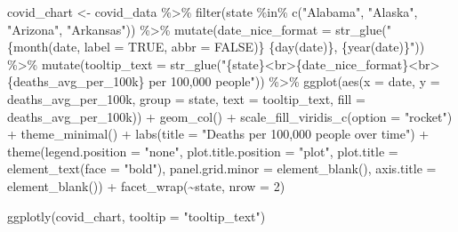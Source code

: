 \documentclass[
]{book}
\newenvironment{Shaded}{\begin{snugshade}}{\end{snugshade}}
\newcommand{\AttributeTok}[1]{\textcolor[rgb]{0.77,0.63,0.00}{#1}}
\newcommand{\DecValTok}[1]{\textcolor[rgb]{0.00,0.00,0.81}{#1}}
\newcommand{\FunctionTok}[1]{\textcolor[rgb]{0.00,0.00,0.00}{#1}}
\newcommand{\NormalTok}[1]{#1}
\newcommand{\OtherTok}[1]{\textcolor[rgb]{0.56,0.35,0.01}{#1}}
\newcommand{\SpecialCharTok}[1]{\textcolor[rgb]{0.00,0.00,0.00}{#1}}
\newcommand{\StringTok}[1]{\textcolor[rgb]{0.31,0.60,0.02}{#1}}
\begin{document}
\begin{Shaded}
\begin{Highlighting}[]
\NormalTok{covid\_chart }\OtherTok{\textless{}{-}}\NormalTok{ covid\_data }\SpecialCharTok{\%\textgreater{}\%} 
  \FunctionTok{filter}\NormalTok{(state }\SpecialCharTok{\%in\%} \FunctionTok{c}\NormalTok{(}\StringTok{"Alabama"}\NormalTok{,}
                      \StringTok{"Alaska"}\NormalTok{,}
                      \StringTok{"Arizona"}\NormalTok{,}
                      \StringTok{"Arkansas"}\NormalTok{)) }\SpecialCharTok{\%\textgreater{}\%} 
    \FunctionTok{mutate}\NormalTok{(}\AttributeTok{date\_nice\_format =} \FunctionTok{str\_glue}\NormalTok{(}\StringTok{"\{month(date, label = TRUE, abbr = FALSE)\} \{day(date)\}, \{year(date)\}"}\NormalTok{)) }\SpecialCharTok{\%\textgreater{}\%} 
  \FunctionTok{mutate}\NormalTok{(}\AttributeTok{tooltip\_text =} \FunctionTok{str\_glue}\NormalTok{(}\StringTok{"\{state\}\textless{}br\textgreater{}\{date\_nice\_format\}\textless{}br\textgreater{}\{deaths\_avg\_per\_100k\} per 100,000 people"}\NormalTok{)) }\SpecialCharTok{\%\textgreater{}\%} 
  \FunctionTok{ggplot}\NormalTok{(}\FunctionTok{aes}\NormalTok{(}\AttributeTok{x =}\NormalTok{ date,}
             \AttributeTok{y =}\NormalTok{ deaths\_avg\_per\_100k,}
             \AttributeTok{group =}\NormalTok{ state,}
             \AttributeTok{text =}\NormalTok{ tooltip\_text,}
             \AttributeTok{fill =}\NormalTok{ deaths\_avg\_per\_100k)) }\SpecialCharTok{+}
  \FunctionTok{geom\_col}\NormalTok{() }\SpecialCharTok{+}
  \FunctionTok{scale\_fill\_viridis\_c}\NormalTok{(}\AttributeTok{option =} \StringTok{"rocket"}\NormalTok{) }\SpecialCharTok{+}
  \FunctionTok{theme\_minimal}\NormalTok{() }\SpecialCharTok{+}
  \FunctionTok{labs}\NormalTok{(}\AttributeTok{title =} \StringTok{"Deaths per 100,000 people over time"}\NormalTok{) }\SpecialCharTok{+}
  \FunctionTok{theme}\NormalTok{(}\AttributeTok{legend.position =} \StringTok{"none"}\NormalTok{,}
        \AttributeTok{plot.title.position =} \StringTok{"plot"}\NormalTok{,}
        \AttributeTok{plot.title =} \FunctionTok{element\_text}\NormalTok{(}\AttributeTok{face =} \StringTok{"bold"}\NormalTok{),}
        \AttributeTok{panel.grid.minor =} \FunctionTok{element\_blank}\NormalTok{(),}
        \AttributeTok{axis.title =} \FunctionTok{element\_blank}\NormalTok{()) }\SpecialCharTok{+}
  \FunctionTok{facet\_wrap}\NormalTok{(}\SpecialCharTok{\textasciitilde{}}\NormalTok{state,}
             \AttributeTok{nrow =} \DecValTok{2}\NormalTok{)}


\FunctionTok{ggplotly}\NormalTok{(covid\_chart,}
                 \AttributeTok{tooltip =} \StringTok{"tooltip\_text"}\NormalTok{)}
\end{Highlighting}
\end{Shaded}
\end{document}
